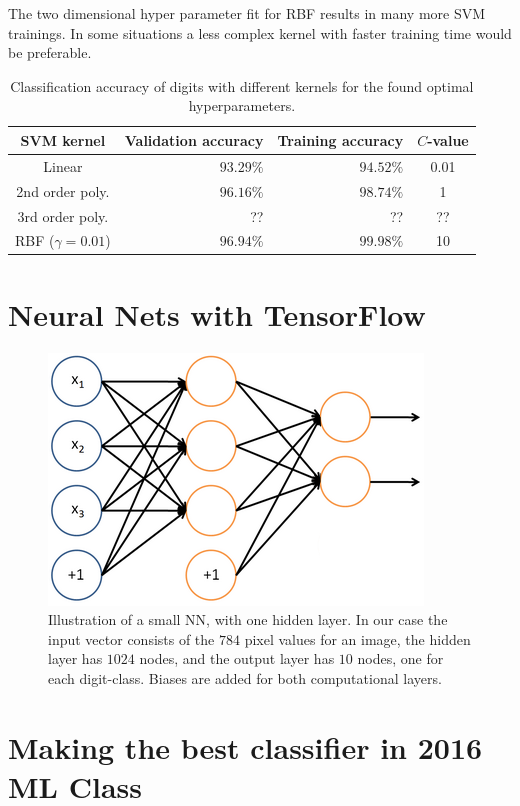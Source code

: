 \documentclass[a4paper,10pt,article,oneside,english]{memoir}
\begin{document}
The two dimensional hyper parameter fit for RBF results in many more SVM trainings. In some situations a less complex kernel with faster training time would be preferable.

\begin{table}[h!]
	\centering
	\caption{Classification accuracy of digits with different kernels for the found optimal hyperparameters. }
	\label{tab:svm_accuracy}
	\begin{tabular}{crr S[table-format=2.4]}
		SVM kernel & Validation accuracy & Training accuracy & {$C$-value} \\ 
		\hline 
		Linear & $93.29\%$ & $94.52\%$ & 0.01 \\ 
		2nd order poly. & $96.16\%$ & $98.74\%$ & 1 \\ 
		3rd order poly. & {??} & {??} & {??} \\ 
		RBF ($\gamma=0.01$) & $96.94\%$ & $99.98\%$ & 10 \\ 
	\end{tabular} 
\end{table}










\chapter{Neural Nets with TensorFlow}

\begin{figure}[h!]
	\centering
	\includegraphics[width=0.4\linewidth]{nn_layout.png}
	\caption{Illustration of a small NN, with one hidden layer. In our case the input vector consists of the $784$ pixel values for an image, the hidden layer has $1024$ nodes, and the output layer has $10$ nodes, one for each digit-class. Biases are added for both computational layers.}
	\label{fig:nn_layout}
\end{figure}


\chapter{Making the best classifier in 2016 ML Class}



	
\end{document}
